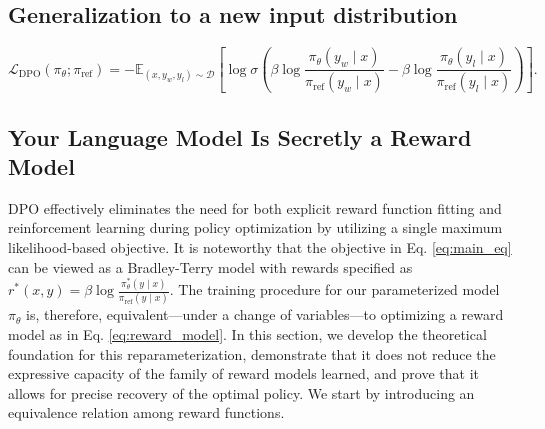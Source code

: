 \subsection{Generalization to a new input distribution}

\begin{equation}\label{eq:optimum_model}
    \mathcal{L}_\text{DPO}(\pi_{\theta}; \pi_\text{ref}) = -\mathbb{E}_{(x, y_w, y_l)\sim \mathcal{D}}\left[\log \sigma \left(\beta \log \frac{\pi_{\theta}(y_w\mid x)}{\pi_\text{ref}(y_w\mid x)} - \beta \log \frac{\pi_{\theta}(y_l\mid x)}{\pi_\text{ref}(y_l\mid x)}\right)\right].
\end{equation}

\subsection{Your Language Model Is Secretly a Reward Model} DPO effectively eliminates the need for both explicit reward function fitting and reinforcement learning during policy optimization by utilizing a single maximum likelihood-based objective. It is noteworthy that the objective in Eq. \ref{eq:main_eq} can be viewed as a Bradley-Terry model with rewards specified as $r^*(x, y) = \beta \log\frac{\pi^*_\theta(y \mid x)}{\pi_\text{ref}(y \mid x)}$. The training procedure for our parameterized model $\pi_{\theta}$ is, therefore, equivalent—under a change of variables—to optimizing a reward model as in Eq. \ref{eq:reward_model}. In this section, we develop the theoretical foundation for this reparameterization, demonstrate that it does not reduce the expressive capacity of the family of reward models learned, and prove that it allows for precise recovery of the optimal policy. We start by introducing an equivalence relation among reward functions.

